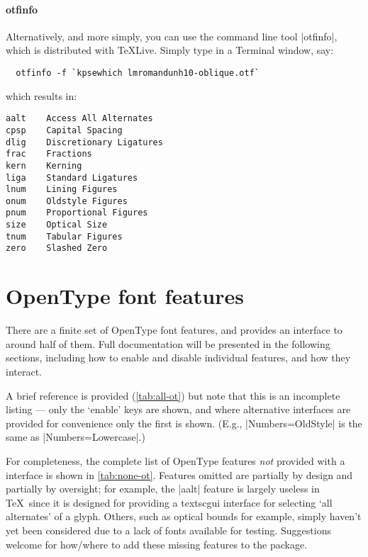 \paragraph{otfinfo}
Alternatively, and more simply, you can use the command line tool |otfinfo|, which is distributed with \TeX{}Live.
Simply type in a Terminal window, say:
\begin{Verbatim}
  otfinfo -f `kpsewhich lmromandunh10-oblique.otf`
\end{Verbatim}
which results in:
\begin{Verbatim}[frame=single]
aalt	Access All Alternates
cpsp	Capital Spacing
dlig	Discretionary Ligatures
frac	Fractions
kern	Kerning
liga	Standard Ligatures
lnum	Lining Figures
onum	Oldstyle Figures
pnum	Proportional Figures
size	Optical Size
tnum	Tabular Figures
zero	Slashed Zero
\end{Verbatim}

\section{OpenType font features}
\label{sec:ot-feat}

There are a finite set of OpenType font features, and  provides an
interface to around half of them.
Full documentation will be presented in the following sections, including how to
enable and disable individual features, and how they interact.

A brief reference is provided (\vref*{tab:all-ot}) but note that this is an incomplete
listing --- only the `enable' keys are shown, and where alternative interfaces are
provided for convenience only the first is shown.
(E.g., |Numbers=OldStyle| is the same as |Numbers=Lowercase|.)

For completeness, the complete list of OpenType features \emph{not} provided with
a  interface is shown in \vref{tab:none-ot}.
Features omitted are partially by design and partially by oversight;
for example, the |aalt| feature is largely useless in \TeX\ since it is designed
for providing a textsc{gui} interface for selecting `all alternates' of a glyph.
Others, such as optical bounds for example, simply haven't yet been considered
due to a lack of fonts available for testing.
Suggestions welcome for how/where to add these missing features to the package.

\ExplSyntaxOn
\def\allOTfeat{
  \prop_map_inline:Nn \g__fontspec_all_opentype_feature_names_prop
    { \opentypefeature{##1}{##2} }
}
\newcommand\opentypefeature[2]{
  \prop_get:NnNT \g__fontspec_OT_features_prop {#1} \tmpa
      {
        \raggedright
        \hangindent=5.2cm
        \makebox[1cm][l]{\textsc{#1}}
        \makebox[4.2cm][l]{
          \int_compare:nT { \tl_count:N \tmpa > 25 } {\ttcondensed} {\ttfamily}
          \tmpa
        }
        \textit{#2}
        \par
        \vspace{2pt}
     }
}
\ExplSyntaxOff

